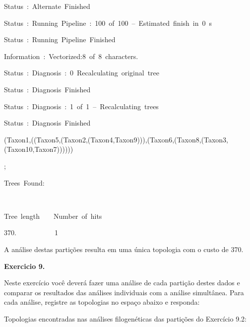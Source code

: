 \begin{refsection}
Status~:~Alternate~Finished

Status~:~Running~Pipeline~:~100~of~100~--~Estimated~finish~in~0~s

Status~:~Running~Pipeline~Finished

Information~:~Vectorized:8~of~8~characters.

Status~:~Diagnosis~:~0~Recalculating~original~tree

Status~:~Diagnosis~Finished

Status~:~Diagnosis~:~1~of~1~--~Recalculating~trees

Status~:~Diagnosis~Finished

(Taxon1,((Taxon5,(Taxon2,(Taxon4,Taxon9))),(Taxon6,(Taxon8,(Taxon3,(Taxon10,Taxon7))))))

;

\vspace{20pt}

Trees~Found:

~~~~~~~~~~~~~~~~~~~~~~~~~~~~~~~~~~~~~~~~~~~~

Tree~length~~~~Number~of~hits

370.~~~~~~~~~~~1

\normalsize

	A análise destas partições resulta em uma única topologia com o custo de 370.\\

\vspace{30pt}

\begin{blackBlock}{\textbf{Exercicio 9.}}\label{tut9:ex:9.2}

Neste exercício você deverá fazer uma análise de cada partição destes dados e comparar os resultados das análises individuais com a análise simultânea. Para cada análise, registre as topologias no espaço abaixo e responda:

\end{blackBlock}


\newpage
Topologias encontradas nas análises filogenéticas das partições do Exercício 9.2:

\begin{center}
\\
\\
\end{center}


\end{refsection}
